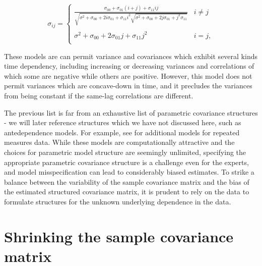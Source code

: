 \begin{equation}
\sigma_{ij} = \left\{ \begin{array}{ll}
\frac{\sigma_{00} + \sigma_{01}\left(i + j\right) + \sigma_{11} ij}{\sqrt{\sigma^2 + \sigma_{00} + 2i\sigma_{01} + \sigma_{11}i^2\sqrt{\sigma^2 + \sigma_{00} + 2j\sigma_{01} +j^2\sigma_{11}} }} &  i \ne j \\ 
& \\
\sigma^2 + \sigma_{00} + 2\sigma_{01}j + \sigma_{11}j^2 &  i= j, \\
\end{array}\right.
\end{equation}
\newline

These models are can permit variance and covariances which exhibit several kinds time dependency, including increasing or decreasing variances and correlations of which some are negative while others are positive. However, this model does not permit variances which are concave-down in time, and it precludes the variances from being constant if the same-lag correlations are different.

\bigskip

The previous list is far from an exhaustive list of parametric covariance structures - we will later reference structures which we have not discussed here, such as antedependence models. For example, see \cite{jennrich1986unbalanced} for additional models for repeated measures data. While these models are computationally attractive and the choices for parametric model structure are seemingly unlimited, specifying the appropriate parametric covariance structure is a challenge even for the experts, and model misspecification can lead to considerably biased estimates. To strike a balance between the variability of the sample covariance matrix and the bias of the estimated structured covariance matrix, it is prudent to rely on the data to formulate structures for the unknown underlying dependence in the data.

\section{Shrinking the sample covariance matrix} \label{chapter-1-shrinking-the-sample-cov}


